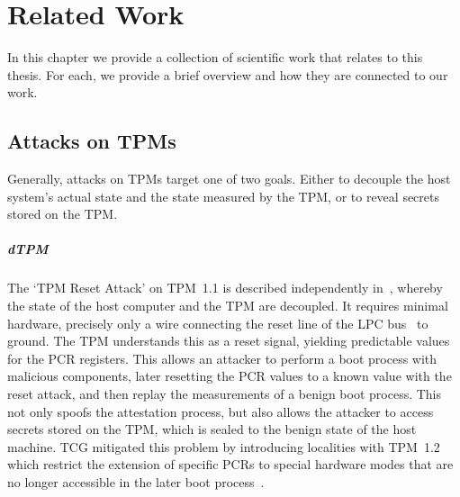 
\chapter{Related Work}\label{chapter:related_work}

In this chapter we provide a collection of scientific work that relates to this thesis.
For each, we provide a brief overview and how they are connected to our work.

\section{Attacks on TPMs}

Generally, attacks on \acp{TPM} target one of two goals.
Either to decouple the host system's actual state and the state measured by the \ac{TPM}, or to reveal secrets stored on the TPM\@.




\paragraph{\Acl{dTPM}}

The `TPM Reset Attack' on TPM~1.1 is described independently in~\cite{kauerBernhard,sparks2007}, whereby the state of the host computer and the TPM are decoupled.
It requires minimal hardware, precisely only a wire connecting the reset line of the LPC bus~\cite{lpc} to ground.
The TPM understands this as a reset signal, yielding predictable values for the \ac{PCR} registers.
This allows an attacker to perform a boot process with malicious components, later resetting the \ac{PCR} values to a known value with the reset attack, and then replay the measurements of a benign boot process.
This not only spoofs the attestation process, but also allows the attacker to access secrets stored on the TPM, which is sealed to the benign state of the host machine.
\Ac{TCG} mitigated this problem by introducing localities with TPM~1.2 which restrict the extension of specific \acp{PCR} to special hardware modes that are no longer accessible in the later boot process~\cite{tpmResetMitigation}.

